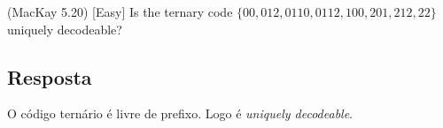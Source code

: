  (MacKay 5.20) [Easy]
 Is the ternary code $\{00, 012, 0110, 0112, 100, 201, 212, 22\}$ uniquely decodeable?
 
 \subsection*{Resposta}
 
 O código ternário é livre de prefixo. Logo é \textit{uniquely decodeable}.
 